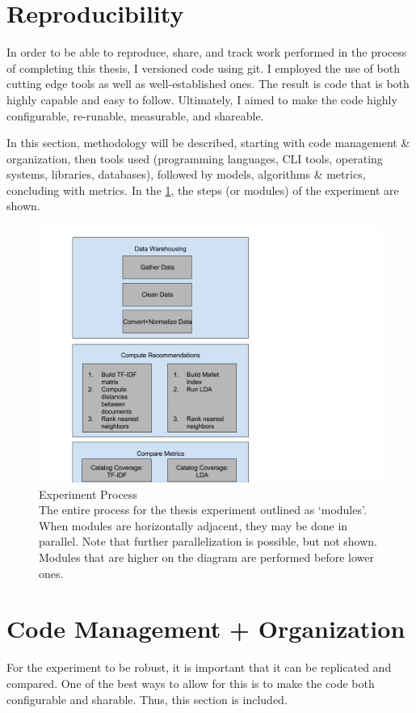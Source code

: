 \section{Reproducibility}
In order to be able to reproduce, share, and track work performed in the process of completing this thesis, I versioned code using git. I employed the use of both cutting edge tools as well as well-established ones. The result is code that is both highly capable and easy to follow. Ultimately, I aimed to make the code highly configurable, re-runable, measurable, and shareable.

In this section, methodology will be described, starting with code management \& organization, then tools used (programming languages, CLI tools, operating systems, libraries, databases), followed by models, algorithms \& metrics, concluding with metrics. In the \ref{fig:entire_process}, the steps (or modules) of the experiment are shown.

\begin{figure}[hhhhhtb]
	\centering
		\includegraphics[width=7.5in,natwidth=810,natheight=942]{figures/entire_process.png}
		\caption[Entire Process]{
			Experiment Process\\
			The entire process for the thesis experiment outlined as `modules'. When modules are horizontally adjacent, they may be done in parallel. Note that further parallelization is possible, but not shown. Modules that are higher on the diagram are performed before lower ones.
		}
	\label{fig:entire_process}
\end{figure}

\section{Code Management + Organization}
For the experiment to be robust, it is important that it can be replicated and compared. One of the best ways to allow for this is to make the code both configurable and sharable. Thus, this section is included.

